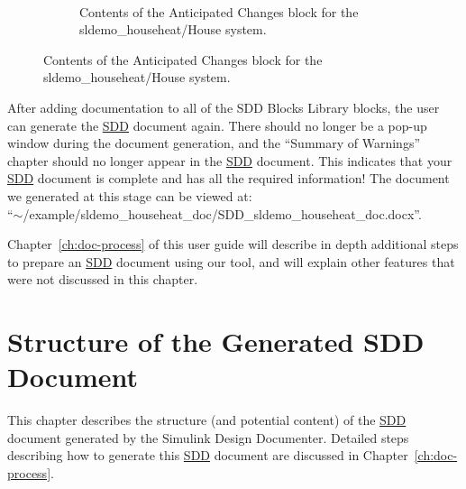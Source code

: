 \documentclass{mcscert}
\newcommand{\sddtool}{Simulink Design Documenter}
\newcommand{\sddblks}{SDD Blocks Library}
\begin{document}
\begin{figure}
\begin{subfigure}[t]{0.45\textwidth}
		\label{fig:house-rationale-2}
	\end{subfigure}
	~
	\begin{subfigure}[t]{0.45\textwidth}
		\caption{Contents of the Anticipated Changes block for the sldemo\_househeat/House system.}
		\label{fig:house-ant-changes-2}
	\end{subfigure}
\end{figure}

After adding documentation to all of the \sddblks{} blocks, the user can generate the \hyperref[acr:sdd]{SDD} document again. 
There should no longer be a pop-up window during the document generation, and the ``Summary of Warnings'' chapter should no longer appear in the \hyperref[acr:sdd]{SDD} document. 
This indicates that your \hyperref[acr:sdd]{SDD} document is complete and has all the required information! The document we generated at this stage can be viewed at:\\
``$\sim$/example/sldemo\_househeat\_doc/SDD\_sldemo\_househeat\_doc.docx''.

Chapter~\ref{ch:doc-process} of this user guide will describe in depth additional steps to prepare an \hyperref[acr:sdd]{SDD} document using our tool, and will explain other features that were not discussed in this chapter.

\chapter{Structure of the Generated SDD Document}
\label{ch:sdd-output}
This chapter describes the structure (and potential content) of the \hyperref[acr:sdd]{SDD} document generated by the \sddtool{}. 
Detailed steps describing how to generate this \hyperref[acr:sdd]{SDD} document are discussed in Chapter~\ref{ch:doc-process}.
\end{document}
